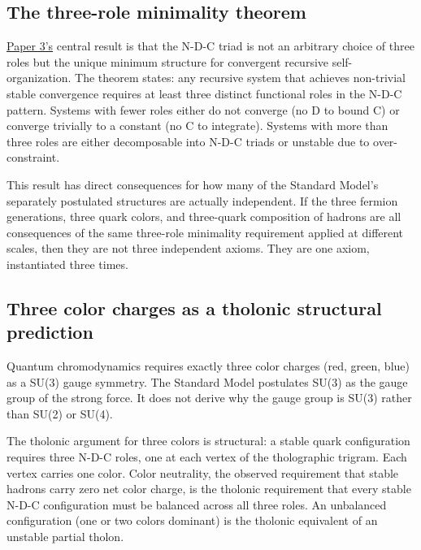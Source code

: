 \documentclass[12pt]{article}
\begin{document}
\subsection{The three-role minimality theorem}\label{the-three-role-minimality-theorem}

\href{https://github.com/baardev/truevalue/blob/main/docnav/Research/papers/3_minimal-recursive-triadic-framework/3_minimal-recursive-triadic-framework.pdf}{Paper
3's} central result is that the N-D-C triad is not an arbitrary choice
of three roles but the unique minimum structure for convergent recursive
self-organization. The theorem states: any recursive system that
achieves non-trivial stable convergence requires at least three distinct
functional roles in the N-D-C pattern. Systems with fewer roles either
do not converge (no D to bound C) or converge trivially to a constant
(no C to integrate). Systems with more than three roles are either
decomposable into N-D-C triads or unstable due to over-constraint.

This result has direct consequences for how many of the Standard Model's
separately postulated structures are actually independent. If the three
fermion generations, three quark colors, and three-quark composition of
hadrons are all consequences of the same three-role minimality
requirement applied at different scales, then they are not three
independent axioms. They are one axiom, instantiated three times.

\subsection{Three color charges as a tholonic structural prediction}\label{three-color-charges-as-a-tholonic-structural-prediction}

Quantum chromodynamics requires exactly three color charges (red, green,
blue) as a SU(3) gauge symmetry. The Standard Model postulates SU(3) as
the gauge group of the strong force. It does not derive why the gauge
group is SU(3) rather than SU(2) or SU(4).

The tholonic argument for three colors is structural: a stable quark
configuration requires three N-D-C roles, one at each vertex of the
tholographic trigram. Each vertex carries one color. Color neutrality,
the observed requirement that stable hadrons carry zero net color
charge, is the tholonic requirement that every stable N-D-C
configuration must be balanced across all three roles. An unbalanced
configuration (one or two colors dominant) is the tholonic equivalent of
an unstable partial tholon.
\end{document}
